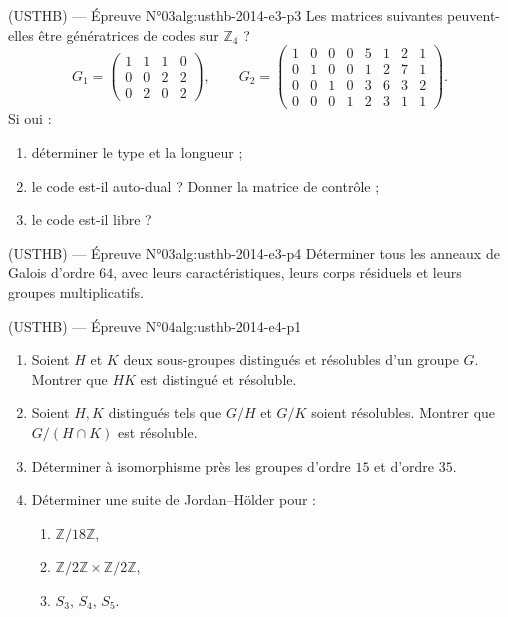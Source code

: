 \begin{problem}{(USTHB) — Épreuve N°03}{alg:usthb-2014-e3-p3}
Les matrices suivantes peuvent-elles être génératrices de codes sur $\mathbb{Z}_4$ ?
$$
G_1=\begin{pmatrix} 1&1&1&0\\ 0&0&2&2\\ 0&2&0&2\end{pmatrix},
\qquad
G_2=\begin{pmatrix} 1&0&0&0&5&1&2&1\\ 0&1&0&0&1&2&7&1\\ 0&0&1&0&3&6&3&2\\ 0&0&0&1&2&3&1&1\end{pmatrix}.
$$
Si oui :
\begin{enumerate}
\item déterminer le type et la longueur ;
\item le code est-il auto-dual ? Donner la matrice de contrôle ;
\item le code est-il libre ?
\end{enumerate}

\end{problem}

\newpage

\begin{problem}{(USTHB) — Épreuve N°03}{alg:usthb-2014-e3-p4}
Déterminer tous les anneaux de Galois d'ordre $64$, avec leurs caractéristiques,
leurs corps résiduels et leurs groupes multiplicatifs.

\end{problem}

\newpage

\begin{problem}{(USTHB) — Épreuve N°04}{alg:usthb-2014-e4-p1}
\begin{enumerate}
\item Soient $H$ et $K$ deux sous-groupes distingués et résolubles d'un groupe $G$.
      Montrer que $HK$ est distingué et résoluble.
\item Soient $H,K$ distingués tels que $G/H$ et $G/K$ soient résolubles. Montrer
      que $G/(H\cap K)$ est résoluble.
\item Déterminer à isomorphisme près les groupes d'ordre $15$ et d'ordre $35$.
\item Déterminer une suite de Jordan--Hölder pour :
      \begin{enumerate}
      \item $\mathbb{Z}/18\mathbb{Z}$,
      \item $\mathbb{Z}/2\mathbb{Z}\times\mathbb{Z}/2\mathbb{Z}$,
      \item $S_3$, $S_4$, $S_5$.
      \end{enumerate}
\end{enumerate}

\end{problem}

